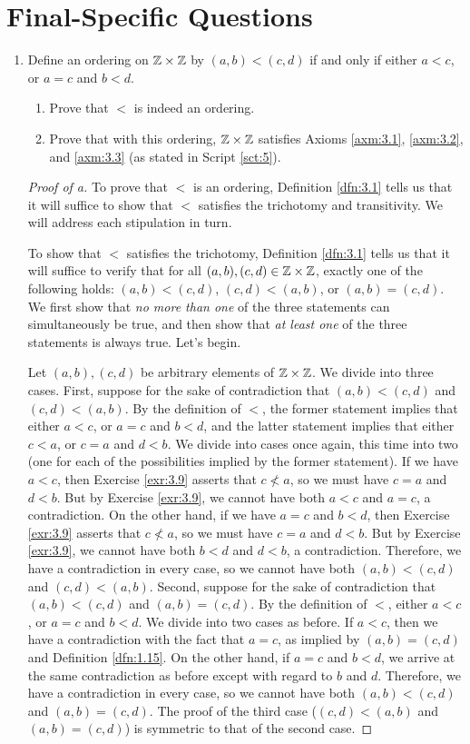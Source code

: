 \documentclass[../main.tex]{subfiles}
\begin{document}
\chapter*{Final-Specific Questions}\label{sct:finalSpecificQuestions}
\begin{enumerate}
    \item Define an ordering on $\mathbb{Z}\times\mathbb{Z}$ by $(a,b)<(c,d)$ if and only if either $a<c$, or $a=c$ and $b<d$.
    \begin{enumerate}
        \item Prove that $<$ is indeed an ordering.
        \item Prove that with this ordering, $\mathbb{Z}\times\mathbb{Z}$ satisfies Axioms \ref{axm:3.1}, \ref{axm:3.2}, and \ref{axm:3.3} (as stated in Script \ref{sct:5}).
    \end{enumerate}
    \begin{proof}[Proof of a]
        To prove that $<$ is an ordering, Definition \ref{dfn:3.1} tells us that it will suffice to show that $<$ satisfies the trichotomy and transitivity. We will address each stipulation in turn.\par\smallskip
        To show that $<$ satisfies the trichotomy, Definition \ref{dfn:3.1} tells us that it will suffice to verify that for all $(a,b),(c,d)\in\mathbb{Z}\times\mathbb{Z}$, exactly one of the following holds: $(a,b)<(c,d)$, $(c,d)<(a,b)$, or $(a,b)=(c,d)$. We first show that \emph{no more than one} of the three statements can simultaneously be true, and then show that \emph{at least one} of the three statements is always true. Let's begin.\par
        Let $(a,b),(c,d)$ be arbitrary elements of $\mathbb{Z}\times\mathbb{Z}$. We divide into three cases. First, suppose for the sake of contradiction that $(a,b)<(c,d)$ and $(c,d)<(a,b)$. By the definition of $<$, the former statement implies that either $a<c$, or $a=c$ and $b<d$, and the latter statement implies that either $c<a$, or $c=a$ and $d<b$. We divide into cases once again, this time into two (one for each of the possibilities implied by the former statement). If we have $a<c$, then Exercise \ref{exr:3.9} asserts that $c\not<a$, so we must have $c=a$ and $d<b$. But by Exercise \ref{exr:3.9}, we cannot have both $a<c$ and $a=c$, a contradiction. On the other hand, if we have $a=c$ and $b<d$, then Exercise \ref{exr:3.9} asserts that $c\not<a$, so we must have $c=a$ and $d<b$. But by Exercise \ref{exr:3.9}, we cannot have both $b<d$ and $d<b$, a contradiction. Therefore, we have a contradiction in every case, so we cannot have both $(a,b)<(c,d)$ and $(c,d)<(a,b)$. Second, suppose for the sake of contradiction that $(a,b)<(c,d)$ and $(a,b)=(c,d)$. By the definition of $<$, either $a<c$, or $a=c$ and $b<d$. We divide into two cases as before. If $a<c$, then we have a contradiction with the fact that $a=c$, as implied by $(a,b)=(c,d)$ and Definition \ref{dfn:1.15}. On the other hand, if $a=c$ and $b<d$, we arrive at the same contradiction as before except with regard to $b$ and $d$. Therefore, we have a contradiction in every case, so we cannot have both $(a,b)<(c,d)$ and $(a,b)=(c,d)$. The proof of the third case ($(c,d)<(a,b)$ and $(a,b)=(c,d)$) is symmetric to that of the second case.\par

\end{proof}
\end{enumerate}
\end{document}

